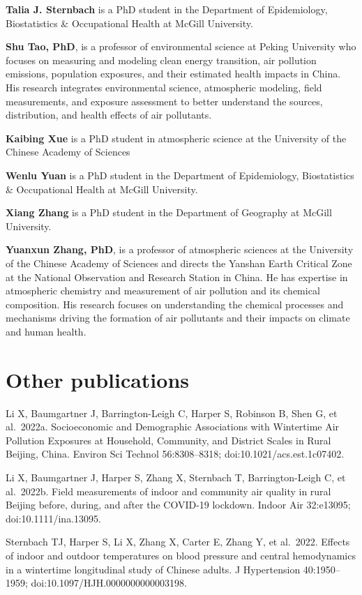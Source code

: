 \documentclass[
  letterpaper,
  DIV=11,
  numbers=noendperiod]{scrartcl}
\begin{document}
\textbf{Talia J. Sternbach} is a PhD student in the Department of
Epidemiology, Biostatistics \& Occupational Health at McGill University.

\textbf{Shu Tao, PhD}, is a professor of environmental science at Peking
University who focuses on measuring and modeling clean energy
transition, air pollution emissions, population exposures, and their
estimated health impacts in China. His research integrates environmental
science, atmospheric modeling, field measurements, and exposure
assessment to better understand the sources, distribution, and health
effects of air pollutants.

\textbf{Kaibing Xue} is a PhD student in atmospheric science at the
University of the Chinese Academy of Sciences

\textbf{Wenlu Yuan} is a PhD student in the Department of Epidemiology,
Biostatistics \& Occupational Health at McGill University.

\textbf{Xiang Zhang} is a PhD student in the Department of Geography at
McGill University.

\textbf{Yuanxun Zhang, PhD}, is a professor of atmospheric sciences at
the University of the Chinese Academy of Sciences and directs the
Yanshan Earth Critical Zone at the National Observation and Research
Station in China. He has expertise in atmospheric chemistry and
measurement of air pollution and its chemical composition. His research
focuses on understanding the chemical processes and mechanisms driving
the formation of air pollutants and their impacts on climate and human
health.

\section*{Other publications}\label{other-publications}

Li X, Baumgartner J, Barrington-Leigh C, Harper S, Robinson B, Shen G,
et al.~2022a. Socioeconomic and Demographic Associations with Wintertime
Air Pollution Exposures at Household, Community, and District Scales in
Rural Beijing, China. Environ Sci Technol 56:8308--8318;
doi:10.1021/acs.est.1c07402.

Li X, Baumgartner J, Harper S, Zhang X, Sternbach T, Barrington-Leigh C,
et al.~2022b. Field measurements of indoor and community air quality in
rural Beijing before, during, and after the COVID-19 lockdown. Indoor
Air 32:e13095; doi:10.1111/ina.13095.

Sternbach TJ, Harper S, Li X, Zhang X, Carter E, Zhang Y, et al.~2022.
Effects of indoor and outdoor temperatures on blood pressure and central
hemodynamics in a wintertime longitudinal study of Chinese adults. J
Hypertension 40:1950--1959; doi:10.1097/HJH.0000000000003198.
\end{document}
